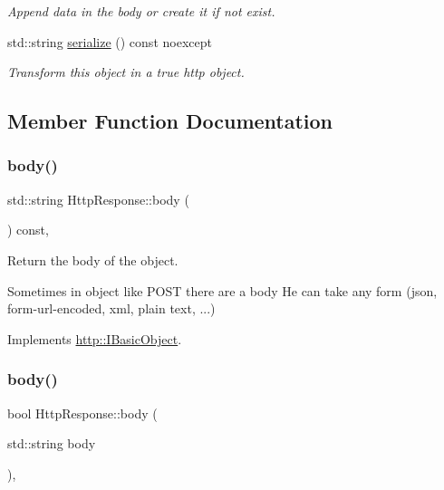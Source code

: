 \begin{DoxyCompactItemize}
\begin{DoxyCompactList}\small\item\em Append data in the body or create it if not exist. \end{DoxyCompactList}\item 
\mbox{\label{classHttpResponse_aad0171e5838c46a14c562d4cfe771f4e}} 
std\+::string \hyperlink{classHttpResponse_aad0171e5838c46a14c562d4cfe771f4e}{serialize} () const noexcept
\begin{DoxyCompactList}\small\item\em Transform this object in a true http object. \end{DoxyCompactList}\end{DoxyCompactItemize}


\subsection{Member Function Documentation}
\mbox{\label{classHttpResponse_a696715c993a4ec50a609efcd43d98a62}} 
\subsubsection{\texorpdfstring{body()}{body()}\hspace{0.1cm}{\footnotesize\ttfamily [1/2]}}
{\footnotesize\ttfamily std\+::string Http\+Response\+::body (\begin{DoxyParamCaption}{ }\end{DoxyParamCaption}) const\hspace{0.3cm}{\ttfamily [virtual]}, {\ttfamily [noexcept]}}



Return the body of the object. 

Sometimes in object like P\+O\+ST there are a body He can take any form (json, form-\/url-\/encoded, xml, plain text, ...) 

Implements \hyperlink{structhttp_1_1IBasicObject_a42eda0e62758f23d9d7d1fee01d8747a}{http\+::\+I\+Basic\+Object}.

\mbox{\label{classHttpResponse_a26f66b018b250a0ee37859730e131404}} 
\subsubsection{\texorpdfstring{body()}{body()}\hspace{0.1cm}{\footnotesize\ttfamily [2/2]}}
{\footnotesize\ttfamily bool Http\+Response\+::body (\begin{DoxyParamCaption}\item[{std\+::string}]{body }\end{DoxyParamCaption})\hspace{0.3cm}{\ttfamily [virtual]}, {\ttfamily [noexcept]}}



